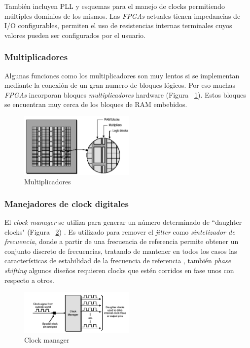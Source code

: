 		También incluyen PLL y esquemas para el manejo de clocks permitiendo múltiples dominios de los mismos. Las \textit{FPGAs} actuales tienen
		impedancias de I/O configurables, permiten el uso de resistencias internas terminales cuyos valores pueden ser configurados por el usuario.

		\subsubsection{Multiplicadores}
		Algunas funciones como los multiplicadores son muy lentos si se implementan mediante la conexión de un gran numero de bloques lógicos. Por eso
		muchas \textit{FPGAs} incorporan bloques \textit{multiplicadores} hardware (Figura ~\ref{fig:mult}). Estos bloques se encuentran muy cerca de los
		bloques de RAM embebidos.
		
		\begin{figure}[h!]
 		\begin{center}
 		\includegraphics[width=0.5\textwidth,keepaspectratio=true]{./images/multram}
  		\caption{Multiplicadores}
  		\label{fig:mult}
 		\end{center}
		\end{figure}

		\subsubsection{Manejadores de clock digitales}
		El \textit{clock manager} se utiliza para generar un número determinado de “daughter clocks" (Figura ~\ref{fig:dclocks}) . Es utilizado para
		remover el \textit{jitter} como \textit{sintetizador de frecuencia}, donde a partir de una frecuencia de referencia permite obtener un conjunto
		discreto de frecuencias, tratando de mantener en todos los casos las características de estabilidad de la frecuencia de referencia
		\cite{Etiqueta03}, también \textit{phase shifting} algunos diseños requieren clocks que estén corridos en fase unos con respecto a otros.

		\begin{figure}[h!]
 		\begin{center}
 		\includegraphics[width=0.5\textwidth,keepaspectratio=true]{./images/dougther}
  		\caption{Clock manager}
  		\label{fig:dclocks}
 		\end{center}
		\end{figure}

